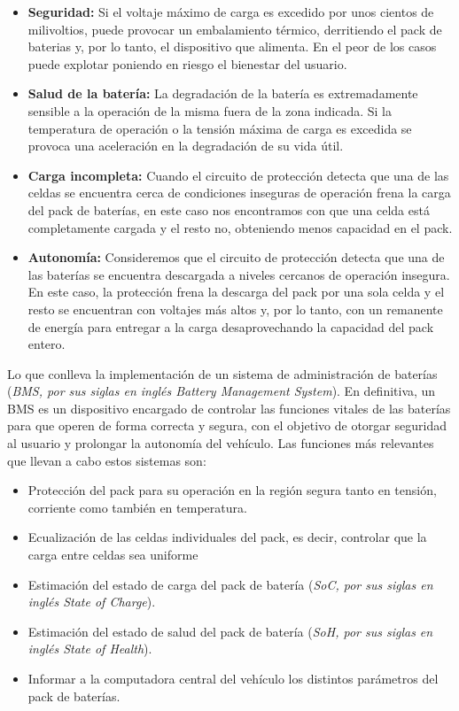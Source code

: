 \documentclass[10pt,a4paper]{article}
\begin{document}
	\begin{itemize}
		\item \textbf{Seguridad:} Si el voltaje máximo de carga es excedido por 
        unos cientos de milivoltios, puede provocar un embalamiento térmico, 
        derritiendo el pack de baterias y, por lo tanto, el dispositivo que 
        alimenta. En el peor de los casos puede explotar poniendo en riesgo el 
        bienestar del usuario.
		\item \textbf{Salud de la batería:} La degradación de la batería es 
        extremadamente sensible a la operación de la misma fuera de la zona 
        indicada. Si la temperatura de operación o la tensión máxima de carga 
        es excedida se provoca una aceleración en la degradación de su vida 
        útil.
		\item \textbf{Carga incompleta:} Cuando el circuito de protección 
        detecta que una de las celdas se encuentra cerca de condiciones 
        inseguras de operación frena la carga del pack de baterías, en este 
        caso nos encontramos con que una celda está completamente cargada y el 
        resto no, obteniendo menos capacidad en el pack.
		\item \textbf{Autonomía:} Consideremos que el circuito de protección 
        detecta que una de las baterías se encuentra descargada a niveles 
        cercanos de operación insegura. En este caso, la protección frena la 
        descarga del pack por una sola celda y el resto se encuentran con 
        voltajes más altos y, por lo tanto, con un remanente de energía para 
        entregar a la carga desaprovechando la capacidad del pack entero.
	\end{itemize}
    
    \noindent Lo que conlleva la implementación de un sistema de administración 
    de baterías (\emph{BMS, por sus siglas en inglés Battery Management 
    System}). En definitiva, un BMS es un dispositivo encargado de controlar las 
    funciones vitales de las baterías para que operen de forma correcta y segura, 
    con el objetivo de otorgar seguridad al usuario y prolongar la autonomía del 
    vehículo. Las funciones más relevantes que llevan a cabo estos sistemas son:
	
	\begin{itemize}
		\item Protección del pack para su operación en la región segura tanto 
            en tensión, corriente como también en temperatura.
		\item Ecualización de las celdas individuales del pack, es decir,
            controlar que la carga entre celdas sea uniforme
		\item Estimación del estado de carga del pack de batería 
            (\emph{SoC, por sus siglas en inglés State of Charge}).
		\item Estimación del estado de salud del pack de batería 
            (\emph{SoH, por sus siglas en inglés State of Health}).
		\item Informar a la computadora central del vehículo los distintos 
            parámetros del pack de baterías.
	\end{itemize}
\end{document}
